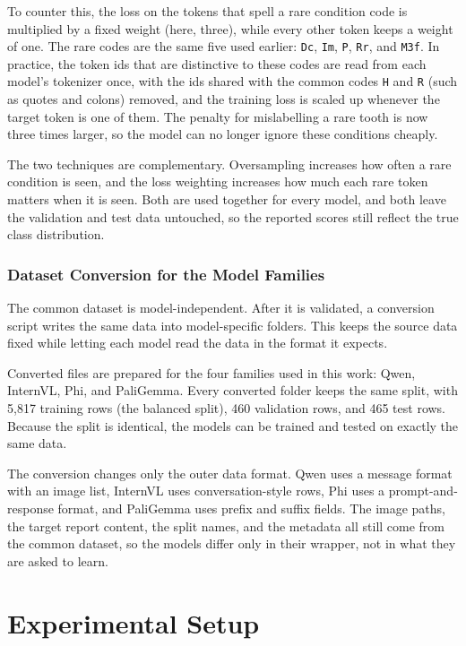 \documentclass[a4paper,12pt]{report}
\begin{document}
To counter this, the loss on the tokens that spell a rare condition code is multiplied by a fixed weight (here, three), while every other token keeps a weight of one. The rare codes are the same five used earlier: \texttt{Dc}, \texttt{Im}, \texttt{P}, \texttt{Rr}, and \texttt{M3f}. In practice, the token ids that are distinctive to these codes are read from each model's tokenizer once, with the ids shared with the common codes \texttt{H} and \texttt{R} (such as quotes and colons) removed, and the training loss is scaled up whenever the target token is one of them. The penalty for mislabelling a rare tooth is now three times larger, so the model can no longer ignore these conditions cheaply.

The two techniques are complementary. Oversampling increases how often a rare condition is seen, and the loss weighting increases how much each rare token matters when it is seen. Both are used together for every model, and both leave the validation and test data untouched, so the reported scores still reflect the true class distribution.

\subsection{Dataset Conversion for the Model Families}

The common dataset is model-independent. After it is validated, a conversion script writes the same data into model-specific folders. This keeps the source data fixed while letting each model read the data in the format it expects.

Converted files are prepared for the four families used in this work: Qwen, InternVL, Phi, and PaliGemma. Every converted folder keeps the same split, with 5{,}817 training rows (the balanced split), 460 validation rows, and 465 test rows. Because the split is identical, the models can be trained and tested on exactly the same data.

The conversion changes only the outer data format. Qwen uses a message format with an image list, InternVL uses conversation-style rows, Phi uses a prompt-and-response format, and PaliGemma uses prefix and suffix fields. The image paths, the target report content, the split names, and the metadata all still come from the common dataset, so the models differ only in their wrapper, not in what they are asked to learn.

\chapter{Experimental Setup}
\end{document}
